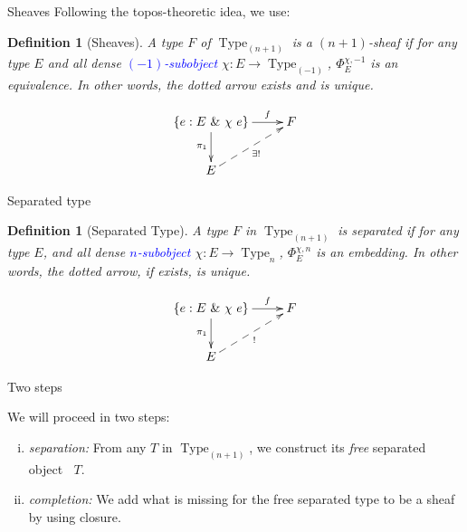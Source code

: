 \documentclass{beamer}
\newtheorem{defi}[thm]{Definition}
\DeclareMathOperator{\Type}{Type}
\newcommand \separated {\mathop{\square_{n+1}} }
\newcommand{\nType}[1]{\Type_{#1}}
\begin{document}
\begin{frame}{Sheaves}
  Following the topos-theoretic idea, we use:
  \begin{defi}[Sheaves]
    A type $F$ of $\nType {(n+1)}$ is a {\em $(n+1)$-sheaf} if for any type $E$ and all dense \textcolor{blue}{$(-1)$-subobject}
    $\chi : E \to \nType {(-1)}$, $\Phi_E^{\chi,-1}$ is an
    equivalence. In other words, the dotted arrow exists and is unique.

    $$\xymatrix{
      \{e:E~\&~\chi~e\}  \ar[r]^-f \ar[d]_{\pi_1} & F \\
      E \ar@{-->}[ru]_{\exists !}&
    }$$
  \end{defi}
\end{frame}


\begin{frame}{Separated type}
  \begin{defi}[Separated Type]
    A type $F$ in $\nType {(n+1)}$ is {\em separated} if for any type $E$, and
    all dense \textcolor{blue}{$n$-subobject} $\chi : E \to \nType n$,
    $\Phi_E^{\chi,n}$ is an embedding. In other words, the dotted arrow,
    if exists, is unique.

    $$\xymatrix{
      \{e:E~\&~\chi~e\}  \ar[r]^-f \ar[d]_{\pi_1} & F \\
      E \ar@{-->}[ru]_{!}&
    }$$
  \end{defi}
\end{frame}


\begin{frame}{Two steps}
  \note{ }

  We will proceed in two steps: 
  \begin{enumerate}[(i)]
  \item {\em separation:} From any $T$ in $\nType {(n+1)}$, we construct
    its {\em free} separated object $\separated T$.
  \item {\em completion:} We add what is missing for the free 
    separated type to be a sheaf by using closure.
  \end{enumerate}
\end{frame}
\end{document}
